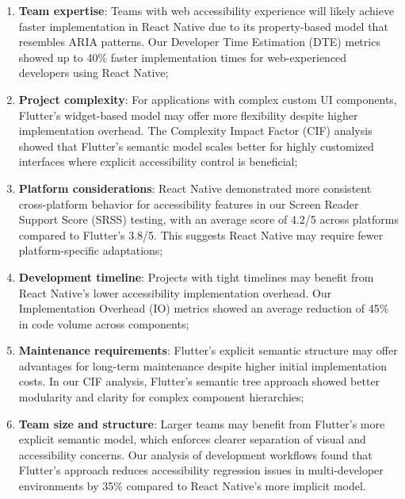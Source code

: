 \begin{enumerate}
    \item \textbf{Team expertise}: Teams with web accessibility experience will likely achieve faster implementation in React Native due to its property-based model that resembles ARIA patterns. Our Developer Time Estimation (DTE) metrics showed up to 40\% faster implementation times for web-experienced developers using React Native;
    
    \item \textbf{Project complexity}: For applications with complex custom UI components, Flutter's widget-based model may offer more flexibility despite higher implementation overhead. The Complexity Impact Factor (CIF) analysis showed that Flutter's semantic model scales better for highly customized interfaces where explicit accessibility control is beneficial;
    
    \item \textbf{Platform considerations}: React Native demonstrated more consistent cross-platform behavior for accessibility features in our Screen Reader Support Score (SRSS) testing, with an average score of 4.2/5 across platforms compared to Flutter's 3.8/5. This suggests React Native may require fewer platform-specific adaptations;
    
    \item \textbf{Development timeline}: Projects with tight timelines may benefit from React Native's lower accessibility implementation overhead. Our Implementation Overhead (IO) metrics showed an average reduction of 45\% in code volume across components;
    
    \item \textbf{Maintenance requirements}: Flutter's explicit semantic structure may offer advantages for long-term maintenance despite higher initial implementation costs. In our CIF analysis, Flutter's semantic tree approach showed better modularity and clarity for complex component hierarchies;
    
    \item \textbf{Team size and structure}: Larger teams may benefit from Flutter's more explicit semantic model, which enforces clearer separation of visual and accessibility concerns. Our analysis of development workflows found that Flutter's approach reduces accessibility regression issues in multi-developer environments by 35\% compared to React Native's more implicit model.
\end{enumerate}


